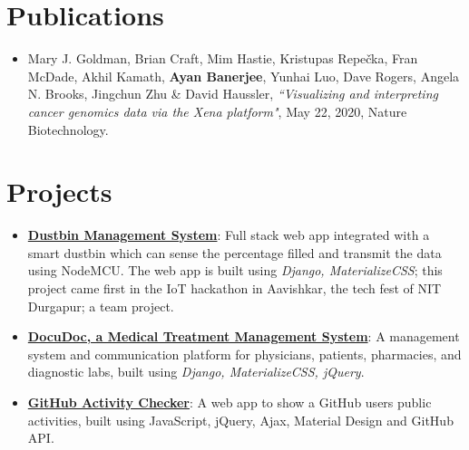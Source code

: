 \documentclass[a4paper,11pt]{article}
\begin{document}

\section{Publications}
    \setlength{\itemsep}{0.5pt}
    \begin{itemize}
        \item{Mary J. Goldman, Brian Craft, Mim Hastie, Kristupas Repečka, Fran McDade, Akhil Kamath, \textbf{Ayan Banerjee}, Yunhai Luo, Dave Rogers, Angela N. Brooks, Jingchun Zhu \& David Haussler}, \textit{``Visualizing and interpreting cancer genomics data via the Xena platform"}, May 22, 2020, Nature Biotechnology.
    \end{itemize}
\section{Projects}
      \setlength{\itemsep}{0.5pt}
      \begin{itemize}
        \item\textbf{\href{https://github.com/Workaholics-nitd/iot-hackathon}{Dustbin Management System}}{: Full stack web app integrated with a smart dustbin which can sense the percentage filled and transmit the data using NodeMCU. The web app is built using \textit{Django, MaterializeCSS}; this project came first in the IoT hackathon in Aavishkar, the tech
        fest of NIT Durgapur; a team project.}
        \item\textbf{\href{https://github.com/ayan-b/DocuDoc}{DocuDoc, a Medical Treatment Management System}}{: A management system and communication platform for physicians, patients, pharmacies, and diagnostic labs, built using \textit{Django, MaterializeCSS, jQuery}.}
        \item\textbf{\href{https://github.com/ayan-b/GitHub-Activity-Checker}{GitHub Activity Checker}}{: A web app to show a GitHub user\textsc{}s public activities, built using JavaScript, jQuery, Ajax, Material Design and GitHub API.}
      \end{itemize}
  
\end{document}

